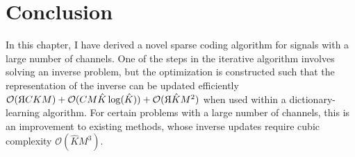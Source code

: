 \section{Conclusion}
In this chapter, I have derived a novel sparse coding algorithm for signals with a large number of channels. One of the steps in the iterative algorithm involves solving an inverse problem, but the optimization is constructed such that the representation of the inverse can be updated efficiently $\bigO(\reflectbox{R}CKM) + \bigO(CM\hat{K}\operatorname{log}(\hat{K})) + \bigO(\reflectbox{R}\hat{K}M^2)$ when used within a dictionary-learning algorithm. For certain problems with a large number of channels, this is an improvement to existing methods, whose inverse updates require cubic complexity $\mathcal{O}(\hat{K}M^3)$.
